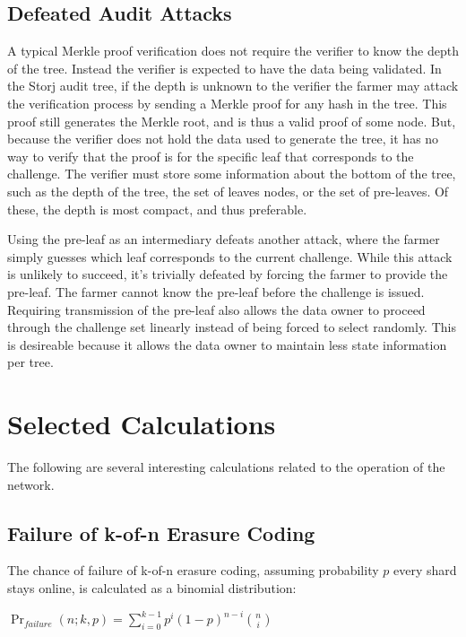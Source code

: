 \documentclass[a4paper,10pt]{article}
\begin{document}
\subsection{Defeated Audit Attacks}
A typical Merkle proof verification does not require the verifier to know the depth of the tree. Instead the verifier is expected to have the data being validated. In the Storj audit tree, if the depth is unknown to the verifier the farmer may attack the verification process by sending a Merkle proof for any hash in the tree. This proof still generates the Merkle root, and is thus a valid proof of some node. But, because the verifier does not hold the data used to generate the tree, it has no way to verify that the proof is for the specific leaf that corresponds to the challenge. The verifier must store some information about the bottom of the tree, such as the depth of the tree, the set of leaves nodes, or the set of pre-leaves. Of these, the depth is most compact, and thus preferable.

Using the pre-leaf as an intermediary defeats another attack, where the farmer simply guesses which leaf corresponds to the current challenge. While this attack is unlikely to succeed, it’s trivially defeated by forcing the farmer to provide the pre-leaf. The farmer cannot know the pre-leaf before the challenge is issued. Requiring transmission of the pre-leaf also allows the data owner to proceed through the challenge set linearly instead of being forced to select randomly. This is desireable because it allows the data owner to maintain less state information per tree.

\section{Selected Calculations}
The following are several interesting calculations related to the operation of the network.

\subsection{Failure of k-of-n Erasure Coding}
The chance of failure of k-of-n erasure coding, assuming probability $ p $ every shard stays online, is calculated as a binomial distribution:

{\centering
$\Pr_{failure}(n; k,p) = \displaystyle \sum_{i=0}^{k-1} p^{i}(1-p)^{n-i}{n \choose i}$
\\}
\end{document}
